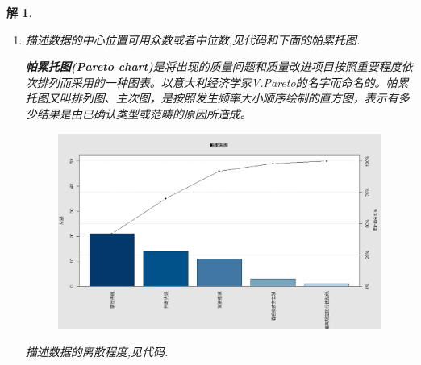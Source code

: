 \documentclass[11pt,a4paper]{ctexart}
\newtheorem*{solution}{解}
\begin{document}
\begin{solution}
\begin{enumerate}
	\item[5.] 描述数据的中心位置可用众数或者中位数,见代码和下面的帕累托图.
\begin{tcolorbox}[colback=blue!7!white,colframe=blue!40]
	\textbf{帕累托图(Pareto chart)}是将出现的质量问题和质量改进项目按照重要程度依次排列而采用的一种图表。以意大利经济学家V.Pareto的名字而命名的。帕累托图又叫排列图、主次图，是按照发生频率大小顺序绘制的直方图，表示有多少结果是由已确认类型或范畴的原因所造成。
\end{tcolorbox}
\begin{figure}[H]
	\centering
	\includegraphics[width=\textwidth]{7.png}
\end{figure}

描述数据的离散程度,见代码.
\end{enumerate}
\end{solution}
\end{document}
